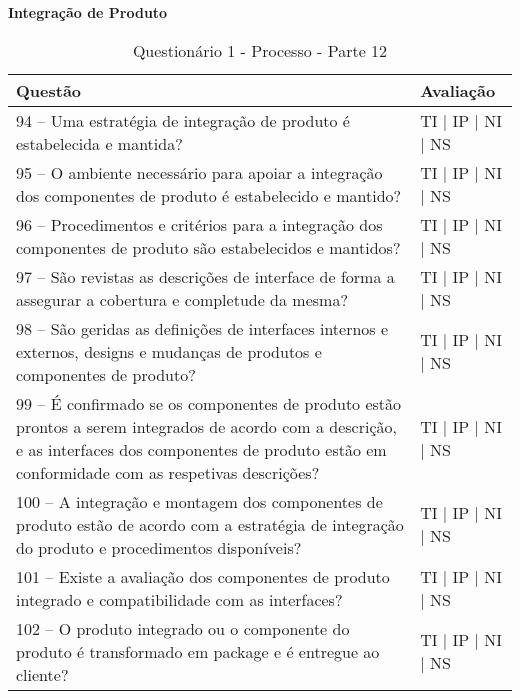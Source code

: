 \documentclass[openany,10pt,a4paper]{article}
\begin{document}
\begin{appendix}
\begin{table}[h]
\textbf{Integração de Produto}
	\centering
	\caption{Questionário 1 - Processo - Parte 12}
	\begin{tabular}{p{3.5in}p{2in}}		
		\toprule
		\textbf{Questão}  & \textbf{Avaliação}\\ 
		\midrule
		94 – Uma estratégia de integração de produto é estabelecida e mantida?
 & TI | IP | NI | NS \\
        \midrule
		95 – O ambiente necessário para apoiar a integração dos componentes de produto é 
estabelecido e mantido?
 & TI | IP | NI | NS \\
		\midrule
		96 – Procedimentos e critérios para a integração dos componentes de produto são estabelecidos 
e mantidos?
 & TI | IP | NI | NS \\
		\midrule
        97 – São revistas as descrições de interface de forma a assegurar a cobertura e completude da 
mesma?
 & TI | IP | NI | NS \\
		\midrule
		98 – São geridas as definições de interfaces internos e externos, designs e mudanças de produtos 
e componentes de produto?
  & TI | IP | NI | NS \\
		\midrule
		99 – É confirmado se os componentes de produto estão prontos a serem integrados de acordo 
com a descrição, e as interfaces dos componentes de produto estão em conformidade com as
respetivas descrições? 
 & TI | IP | NI | NS \\
 \midrule
		100 – A integração e montagem dos componentes de produto estão de acordo com a estratégia
de integração do produto e procedimentos disponíveis? 
 & TI | IP | NI | NS \\
 \midrule
		101 – Existe a avaliação dos componentes de produto integrado e compatibilidade com as
interfaces? 
 & TI | IP | NI | NS \\
 \midrule
		102 – O produto integrado ou o componente do produto é transformado em package e é
entregue ao cliente? 
 & TI | IP | NI | NS \\
		\bottomrule
	\end{tabular} 
	\label{tab:tabela1}
\end{table}


\end{appendix}
\end{document}
